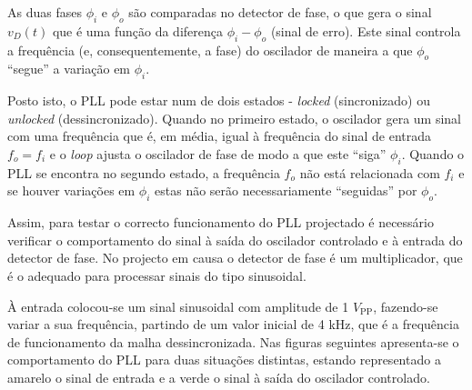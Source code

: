 \documentclass[11pt]{article}
\numberwithin{equation}{section}
\begin{document}
{As duas fases $\phi_{i}$ e $\phi_{o}$ são comparadas no detector de fase, o que gera o sinal $v_{D}\left(t\right)$ que é uma função da diferença $\phi_{i} - \phi_{o}$ (sinal de erro). Este sinal controla a frequência (e, consequentemente, a fase) do oscilador de maneira a que $\phi_{o}$ ``segue'' a variação em $\phi_{i}$.

Posto isto, o PLL pode estar num de dois estados - \textit{locked} (sincronizado) ou \textit{unlocked} (dessincronizado). Quando no primeiro estado, o oscilador gera um sinal com uma frequência que é, em média, igual à frequência do sinal de entrada $f_o = f_i$ e o \textit{loop} ajusta o oscilador de fase de modo a que este ``siga'' $\phi_{i}$. Quando o PLL se encontra no segundo estado, a frequência $f_o$ não está relacionada com $f_i$ e se houver variações em $\phi_{i}$ estas não serão necessariamente ``seguidas'' por $\phi_{o}$.

Assim, para testar o correcto funcionamento do PLL projectado é necessário verificar o comportamento do sinal à saída do oscilador controlado e à entrada do detector de fase. No projecto em causa o detector de fase é um multiplicador, que é o adequado para processar sinais do tipo sinusoidal. 

À entrada colocou-se um sinal sinusoidal com amplitude de 1 $V_{\text{PP}}$, fazendo-se variar a sua frequência, partindo de um valor inicial de 4 kHz, que é a frequência de funcionamento da malha dessincronizada. Nas figuras seguintes apresenta-se o comportamento do PLL para duas situações distintas, estando representado a amarelo o sinal de entrada e a verde o sinal à saída do oscilador controlado.

}
\end{document}

